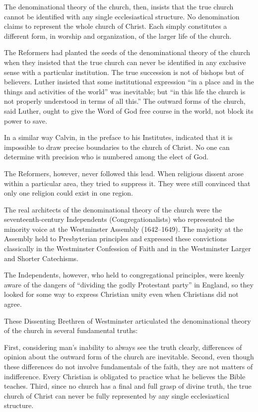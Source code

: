The denominational theory of the church, then, insists that the true church cannot be identified
with any single ecclesiastical structure. No denomination claims to represent the whole church of
Christ. Each simply constitutes a different form, in worship and organization, of the larger life of
the church.

The Reformers had planted the seeds of the denominational theory of the church when they insisted
that the true church can never be identified in any exclusive sense with a particular institution.
The true succession is not of bishops but of believers. Luther insisted that some institutional
expression “in a place and in the things and activities of the world” was inevitable; but “in this
life the church is not properly understood in terms of all this.” The outward forms of the church,
said Luther, ought to give the Word of God free course in the world, not block its power to save.

In a similar way Calvin, in the preface to his Institutes, indicated that it is impossible to draw
precise boundaries to the church of Christ. No one can determine with precision who is numbered
among the elect of God.

The Reformers, however, never followed this lead. When religious dissent arose within a particular
area, they tried to suppress it. They were still convinced that only one religion could exist in one
region.

The real architects of the denominational theory of the church were the seventeenth-century
Independents (Congregationalists) who represented the minority voice at the Westminster Assembly
(1642–1649). The majority at the Assembly held to Presbyterian principles and expressed these
convictions classically in the Westminster Confession of Faith and in the Westminster Larger and
Shorter Catechisms.

The Independents, however, who held to congregational principles, were keenly aware of the dangers
of “dividing the godly Protestant party” in England, so they looked for some way to express
Christian unity even when Christians did not agree.

These Dissenting Brethren of Westminster articulated the denominational theory of the church in
several fundamental truths:

First, considering man’s inability to always see the truth clearly, differences of opinion about the
outward form of the church are inevitable. Second, even though these differences do not involve
fundamentals of the faith, they are not matters of indifference. Every Christian is obligated to
practice what he believes the Bible teaches. Third, since no church has a final and full grasp of
divine truth, the true church of Christ can never be fully represented by any single ecclesiastical
structure.

